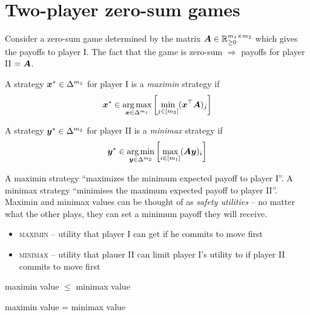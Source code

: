 \section{Two-player zero-sum games}
\label{sec:TPZSgames}
Consider a zero-sum game determined by the matrix $\bm{A} \in
\mathbb{R}^{m_1 \times m_2}_{\ge 0}$ which gives the payoffs to player I.
The fact that the game is zero-sum $\Rightarrow$ payoffs for player II
$=\bm{A}$.

\begin{definition}[Maximin]
	A strategy $\bm{x}^* \in \Delta^{m_1}$ for player I is a \textit{maximin}
	strategy if
	\begin{equation}
		\bm{x}^* \in \operatorname*{arg\,max}_{\bm{x} \in \Delta^{m_1}} \left[
			\min_{j \in [m_2]} (\bm{x}^\top \bm{A})_j \right]
	\end{equation}
\end{definition}

\begin{definition}[Minimax]
	A strategy $\bm{y}^* \in \Delta^{m_2}$ for player II is a
	\textit{minimax} strategy if
	\begin{equation}
		\bm{y}^* \in \operatorname*{arg\,min}_{\bm{y} \in \Delta^{m_2}} \left[
			\max_{i \in [m_1]} (\bm{A} \bm{y})_i \right]
	\end{equation}
\end{definition}

A maximin strategy ``maximizes the minimum expected payoff to player I''. A
minimax strategy ``minimises the maximum expected payoff to player II''.
Maximin and minimax values can be thought of as \textit{safety utilities}
-- no matter what the other plays, they can set a minimum payoff they will
receive.

\begin{itemize}
	\item \textsc{maximin} -- utility that player I can get if he commits
		to move first
	\item \textsc{minimax} -- utility that plauer II can limit player I's
		utility to if player II commits to move first
\end{itemize}

\begin{fact}
	maximin value $\le$ minimax value
\end{fact}

\begin{theorem}
	maximin value = minimax value
\end{theorem}

